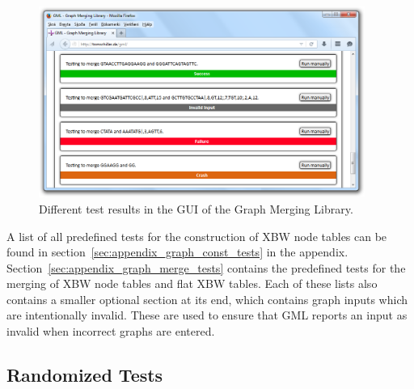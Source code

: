 \documentclass[a4paper,12pt,twoside,BCOR=10mm]{scrbook}
\begin{document}
\begin{figure}[!htb]
\centering
\includegraphics[width=0.95\textwidth]{evo_gml_different_test_results.png}
\caption[GML Test Results]{Different test results in the GUI of the Graph Merging Library.} \label{fig:evo_gml_different_test_results}
\end{figure}
A list of all predefined tests for the construction of XBW node tables can be found 
in section~\ref{sec:appendix_graph_const_tests} in the appendix. 
Section~\ref{sec:appendix_graph_merge_tests} contains the predefined tests for 
the merging of XBW node tables and flat XBW tables. 
Each of these lists also contains a smaller optional section at its end, 
which contains graph inputs which are intentionally invalid. These are used 
to ensure that GML reports an input as invalid when incorrect graphs are entered. 

\subsection{Randomized Tests}
\end{document}
